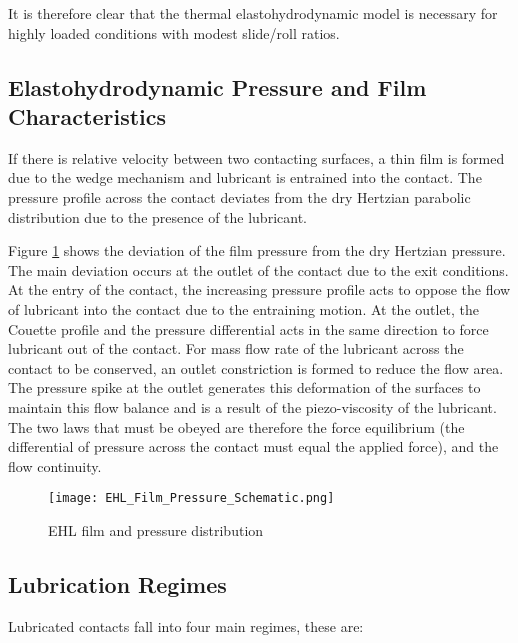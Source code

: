 It is therefore clear that the thermal elastohydrodynamic model is necessary for highly loaded conditions with modest slide/roll ratios.

\subsection{Elastohydrodynamic Pressure and Film Characteristics}

If there is relative velocity between two contacting surfaces, a thin film is formed due to the wedge mechanism and lubricant is entrained into the contact. The pressure profile across the contact deviates from the dry Hertzian parabolic distribution due to the presence of the lubricant.

Figure \ref{EHL_Film_Pressure_Schematic} shows the deviation of the film pressure from the dry Hertzian pressure. The main deviation occurs at the outlet of the contact due to the exit conditions. At the entry of the contact, the increasing pressure profile acts to oppose the flow of lubricant into the contact due to the entraining motion. At the outlet, the Couette profile and the pressure differential acts in the same direction to force lubricant out of the contact. For mass flow rate of the lubricant across the contact to be conserved, an outlet constriction is formed to reduce the flow area. The pressure spike at the outlet generates this deformation of the surfaces to maintain this flow balance and is a result of the piezo-viscosity of the lubricant. The two laws that must be obeyed are therefore the force equilibrium (the differential of pressure across the contact must equal the applied force), and the flow continuity.

\begin{figure}
	\centerline{\texttt{[image: EHL\_Film\_Pressure\_Schematic.png]}}
	\caption{EHL film and pressure distribution \cite{Larsson2013}}
	\label{EHL_Film_Pressure_Schematic}
\end{figure}

\subsection{Lubrication Regimes}

Lubricated contacts fall into four main regimes, these are:

